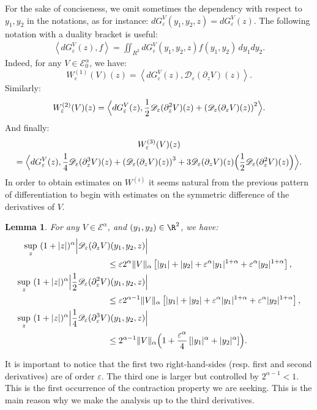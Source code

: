 \documentclass[10pt]{amsart}
\let\mathcal\mathscr
\theoremstyle{plain}
\newtheorem{lem}[thm]{Lemma}
\theoremstyle{definition}
\newcommand{\D}{\mathcal{D}_\eps}
\let\eps\varepsilon
\newcommand{\Babs}[1]{\Bigl\lvert#1\Bigr\rvert}
\newcommand{\Ea}{\mathcal{E}^\alpha}
\newcommand{\Eaz}{\mathcal{E}^\alpha_0}
\newcommand{\QV}{G_\eps^V}
\begin{document}
For the sake of conciseness, we omit sometimes the dependency with respect to $y_1,y_2$ in the notations, as for instance: $d\QV(y_1,y_2,z) = d\QV(z)$.
The following notation with a duality bracket is useful:
\begin{align*}
\left\langle d\QV(z), f \right\rangle = \iint_{R^2} d\QV(y_1,y_2,z) f(y_1, y_2)\, dy_1 dy_2.
\end{align*}
Indeed, for any $V \in \Eaz $, we have:
\begin{equation}\label{eq:W1}
W_\eps^{(1)}(V)(z)= \left\langle d\QV(z), \D(\partial_z V)(z)
\right\rangle.
\end{equation}
Similarly:
\begin{equation*}
W_\eps^{(2)}(V)(z) =
\Bigl\langle d\QV(z), \dfrac{1}{2} \D(\partial_z^2 V)(z) + \left(\D(\partial_z V)(z)
\right)^2
\Bigr\rangle.
\end{equation*}
And finally:
\begin{multline}\label{eq:W3V}
W_\eps^{(3)}(V)(z)\\ =
\Bigl\langle d\QV(z), \dfrac{1}{4} \D(\partial_z^3 V)(z) + \left(\D(\partial_z V)(z)\right)^3
+ 3 \D(\partial_z V)(z) \Bigl(\dfrac{1}{2}\D(\partial_z^2 V)(z) \Bigr) \Bigr\rangle.
\end{multline}
In order to obtain estimates on $W^{(i)}$ it seems natural from the previous pattern of differentiation to begin with estimates on the symmetric difference of the derivatives of $V$.
\begin{lem}\label{estim derivatives}
For any $V\in \Ea$, and $(y_1,y_2) \in \R^2$, we have:
\begin{align}
\label{estim der Ea 1}
\sup_z \ (1+|z|)^\alpha \Babs{ \D(\partial_z V&)(y_1,y_2,z) }\\
& \leq \eps 2^\alpha \Vert V \Vert_\alpha \left[\vert y_1 \vert+ \vert y_2 \vert + \eps^{\alpha}\vert y_1 \vert^{1+\alpha} + \eps^{\alpha}\vert y_2 \vert^{1+\alpha} \right],\notag\\
\label{estim der Ea 2}
\sup_z \ (1+|z|)^\alpha \Babs{ \dfrac{1}{2} \D(\partial_z^2 V&)(y_1,y_2,z) }\\
& \leq \eps 2^{\alpha-1} \Vert V \Vert_\alpha \left[\vert y_1 \vert+ \vert y_2 \vert + \eps^{\alpha}\vert y_1 \vert^{1+\alpha} + \eps^{\alpha}\vert y_2 \vert^{1+\alpha} \right],\notag\\
\label{estim der Ea 3}
\sup_z \ (1+|z|)^\alpha \Babs{ \dfrac{1}{4} \D(\partial_z^3 V&)(y_1,y_2,z)}\\
& \leq 2^{\alpha -1} \Vert V \Vert_\alpha \Bigl(1+ \frac{\eps^\alpha}4 \left[\vert y_1 \vert^{\alpha}+ \vert y_2 \vert^{\alpha} \right] \Bigr).\notag
\end{align}
\end{lem}
It is important to notice that the first two right-hand-sides (resp. first and second derivatives) are of order $\eps$. The third one is larger but controlled by $2^{\alpha-1}<1$. This is the first occurrence of the contraction property we are seeking. This is the main reason why we make the analysis up to the third derivatives.
\end{document}
